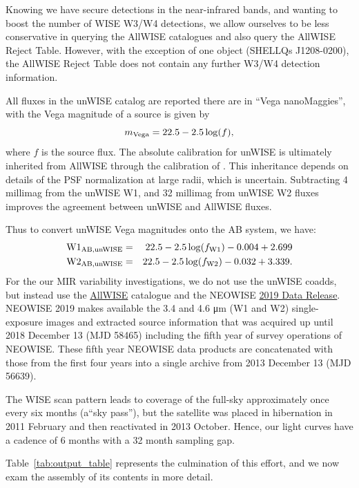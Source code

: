 \documentclass[usenatbib]{mnras}
\begin{document}
Knowing we have secure detections in the near-infrared bands, and wanting to boost the number of WISE W3/W4 detections, we allow ourselves to be less conservative in querying the AllWISE catalogues and also query the AllWISE Reject Table. However, with the exception of one object (SHELLQs  J1208-0200), the AllWISE Reject Table does not contain any further W3/W4 detection information. 

All fluxes in the unWISE catalog are reported there are in ``Vega
nanoMaggies'', with the Vega magnitude of a source is given by
\begin{equation}
m_{\rm Vega} = 22.5 - 2.5\log(f),
\end{equation} 
where $f$ is the source flux. The absolute calibration for unWISE is
ultimately inherited from AllWISE through the calibration of
\citet{Meisner2017a}. This inheritance depends on details of the PSF
normalization at large radii, which is uncertain. Subtracting 4
millimag from the unWISE W1, and 32 millimag from unWISE W2 fluxes
improves the agreement between unWISE and AllWISE fluxes.

Thus to convert unWISE Vega magnitudes onto the AB system, we have:     
\begin{eqnarray*}
        {\rm W1}_{\rm AB, unWISE}  & = &   22.5 - 2.5 \log(f_{\rm W1}) - 0.004 + 2.699 \\
        {\rm W2}_{\rm AB, unWISE}  &  = &  22.5 - 2.5 \log(f_{\rm W2}) - 0.032 + 3.339. 
\end{eqnarray*}
For the our MIR variability investigations, we do not use the unWISE
coadds, but instead use the
\href{http://wise2.ipac.caltech.edu/docs/release/allwise/}{AllWISE}
catalogue and the NEOWISE
\href{http://wise2.ipac.caltech.edu/docs/release/neowise/}{2019 Data
Release}. NEOWISE 2019 makes available the 3.4 and 4.6 μm (W1 and W2)
single-exposure images and extracted source information that was
acquired up until 2018 December 13 (MJD 58465) including the fifth
year of survey operations of NEOWISE. These fifth year NEOWISE data
products are concatenated with those from the first four years into a
single archive from 2013 December 13 (MJD 56639).

The WISE scan pattern leads to coverage of the full-sky approximately
once every six months (a``sky pass''), but the satellite was placed in
hibernation in 2011 February and then reactivated in 2013
October. Hence, our light curves have a cadence of 6 months with a 32
month sampling gap.

Table~\ref{tab:output_table} represents the culmination of this
effort, and we now exam the assembly of its contents in more detail.
\end{document}
